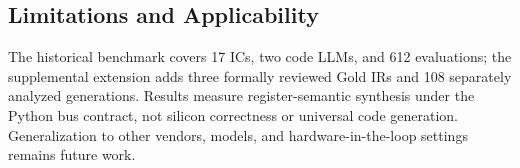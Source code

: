 \documentclass[conference]{IEEEtran}
\begin{document}
\subsection*{Limitations and Applicability}
The historical benchmark covers 17 ICs, two code LLMs, and 612 evaluations; the supplemental extension adds three formally reviewed Gold IRs and 108 separately analyzed generations. Results measure register-semantic synthesis under the Python bus contract, not silicon correctness or universal code generation. Generalization to other vendors, models, and hardware-in-the-loop settings remains future work.



\end{document}
